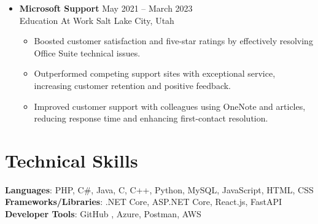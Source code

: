 \documentclass[letterpaper,1pt]{article}
\begin{document}
\begin{itemize}[leftmargin=0.15in, itemsep=0pt, parsep=0pt, label={}]
  \item{
              \textbf{Microsoft Support} \hfill May 2021 -- March 2023 \\
              Education At Work \hfill Salt Lake City, Utah \\
              \begin{itemize}
                \item{Boosted customer satisfaction and five-star ratings by effectively resolving Office Suite technical issues.}
                \item{Outperformed competing support sites with exceptional service, increasing customer retention and positive
                            feedback.}
                \item{Improved customer support with colleagues using OneNote and articles, reducing response time and enhancing
                            first-contact resolution.}
              \end{itemize}
        }

\end{itemize}


\section{\textbf{Technical Skills}}
\begin{itemize}[leftmargin=0.15in, itemsep=0pt, parsep=0pt, label={}]
  \small{\item{
                \textbf{Languages}{: PHP, C\#, Java, C, C++, Python, MySQL,  JavaScript, HTML, CSS} \\
                \textbf{Frameworks/Libraries}{: .NET Core, ASP.NET Core, React.js, FastAPI} \\
                \textbf{Developer Tools}{: GitHub , Azure, Postman, AWS} \\
          }}
\end{itemize}


\end{document}
